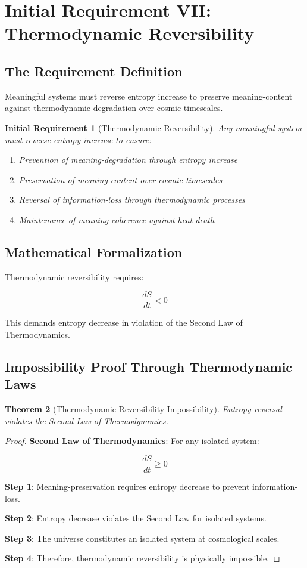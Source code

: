 \documentclass[12pt,a4paper]{article}
\newtheorem{theorem}{Theorem}[section]
\newtheorem{requirement}[theorem]{Initial Requirement}
\begin{document}
\section{Initial Requirement VII: Thermodynamic Reversibility}

\subsection{The Requirement Definition}

Meaningful systems must reverse entropy increase to preserve meaning-content against thermodynamic degradation over cosmic timescales.

\begin{requirement}[Thermodynamic Reversibility]
Any meaningful system must reverse entropy increase to ensure:
\begin{enumerate}
\item Prevention of meaning-degradation through entropy increase
\item Preservation of meaning-content over cosmic timescales
\item Reversal of information-loss through thermodynamic processes
\item Maintenance of meaning-coherence against heat death
\end{enumerate}
\end{requirement}

\subsection{Mathematical Formalization}

Thermodynamic reversibility requires:

$$\frac{dS}{dt} < 0$$

This demands entropy decrease in violation of the Second Law of Thermodynamics.

\subsection{Impossibility Proof Through Thermodynamic Laws}

\begin{theorem}[Thermodynamic Reversibility Impossibility]
Entropy reversal violates the Second Law of Thermodynamics.
\end{theorem}

\begin{proof}
\textbf{Second Law of Thermodynamics}: For any isolated system:

$$\frac{dS}{dt} \geq 0$$

\textbf{Step 1}: Meaning-preservation requires entropy decrease to prevent information-loss.

\textbf{Step 2}: Entropy decrease violates the Second Law for isolated systems.

\textbf{Step 3}: The universe constitutes an isolated system at cosmological scales.

\textbf{Step 4}: Therefore, thermodynamic reversibility is physically impossible.
\end{proof}
\end{document}
